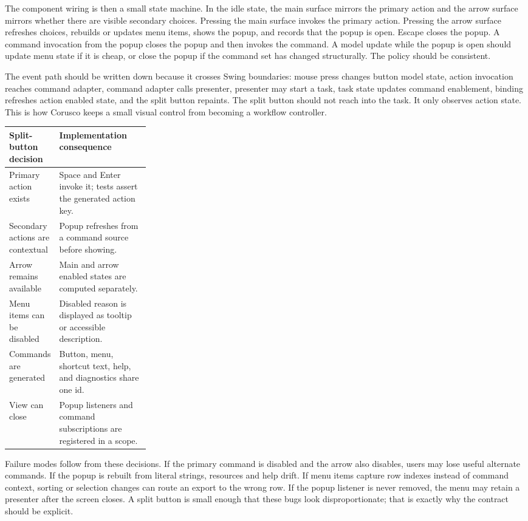 The component wiring is then a small state machine. In the idle state, the main surface
mirrors the primary action and the arrow surface mirrors whether there are visible
secondary choices. Pressing the main surface invokes the primary action. Pressing the
arrow surface refreshes choices, rebuilds or updates menu items, shows the popup, and
records that the popup is open. Escape closes the popup. A command invocation from the
popup closes the popup and then invokes the command. A model update while the popup is
open should update menu state if it is cheap, or close the popup if the command set has
changed structurally. The policy should be consistent.

The event path should be written down because it crosses Swing boundaries: mouse press
changes button model state, action invocation reaches command adapter, command adapter
calls presenter, presenter may start a task, task state updates command enablement,
binding refreshes action enabled state, and the split button repaints. The split button
should not reach into the task. It only observes action state. This is how Corusco keeps
a small visual control from becoming a workflow controller.

\begin{tabularx}{0.96\linewidth}{@{}p{0.27\linewidth}X@{}}
\toprule
Split-button decision & Implementation consequence\\
\midrule
Primary action exists & Space and Enter invoke it; tests assert the generated action key.\\
Secondary actions are contextual & Popup refreshes from a command source before showing.\\
Arrow remains available & Main and arrow enabled states are computed separately.\\
Menu items can be disabled & Disabled reason is displayed as tooltip or accessible description.\\
Commands are generated & Button, menu, shortcut text, help, and diagnostics share one id.\\
View can close & Popup listeners and command subscriptions are registered in a scope.\\
\bottomrule
\end{tabularx}

Failure modes follow from these decisions. If the primary command is disabled and the
arrow also disables, users may lose useful alternate commands. If the popup is rebuilt
from literal strings, resources and help drift. If menu items capture row indexes
instead of command context, sorting or selection changes can route an export to the
wrong row. If the popup listener is never removed, the menu may retain a presenter after
the screen closes. A split button is small enough that these bugs look disproportionate;
that is exactly why the contract should be explicit.

